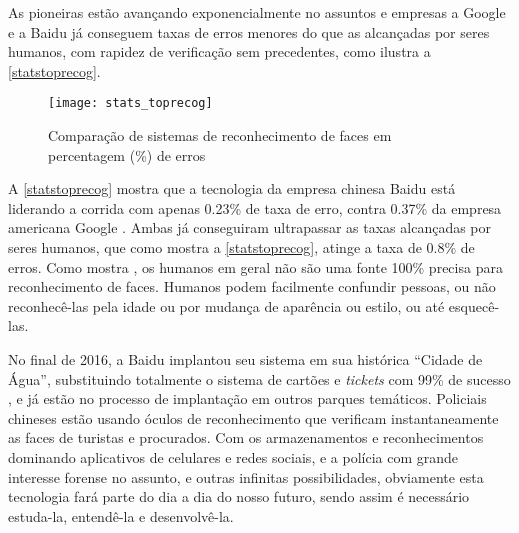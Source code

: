 As pioneiras estão avançando exponencialmente no assuntos e empresas a Google e a Baidu já conseguem taxas de erros menores do que as alcançadas por seres humanos, com rapidez de verificação sem precedentes, como ilustra a \autoref{statstoprecog}.

\vspace*{10cm}
\begin{figure}[h]
	\centering
	\texttt{[image: stats\_toprecog]}
	\caption{Comparação de sistemas de reconhecimento de faces em percentagem (\%) de erros}
	\label{statstoprecog}
\end{figure}


A \autoref{statstoprecog} mostra que a tecnologia da empresa chinesa Baidu está liderando a corrida com apenas 0.23\% de taxa de erro, contra 0.37\% da empresa americana Google \cite{stats_economy_compass_2017}. Ambas já conseguiram ultrapassar as taxas alcançadas por seres humanos, que como mostra a \autoref{statstoprecog}, atinge a taxa de 0.8\% de erros. Como mostra \cite{stats_economy_compass_2017}, os humanos em geral não são uma fonte 100\% precisa para reconhecimento de faces. Humanos podem facilmente confundir pessoas, ou não reconhecê-las pela idade ou por mudança de aparência ou estilo, ou até esquecê-las.

No final de 2016, a Baidu implantou seu sistema em sua histórica “Cidade de Água”, substituindo totalmente o sistema de cartões e \textit{tickets} com 99\% de sucesso \cite{baidiu_theverge}, e já estão no processo de implantação em outros parques temáticos. Policiais chineses estão usando óculos de reconhecimento que verificam instantaneamente as faces de turistas e procurados. Com os armazenamentos e reconhecimentos dominando aplicativos de celulares e redes sociais, e a polícia com grande interesse forense no assunto, e outras infinitas possibilidades, obviamente esta tecnologia fará parte do dia a dia do nosso futuro, sendo assim é necessário estuda-la, entendê-la e desenvolvê-la.











